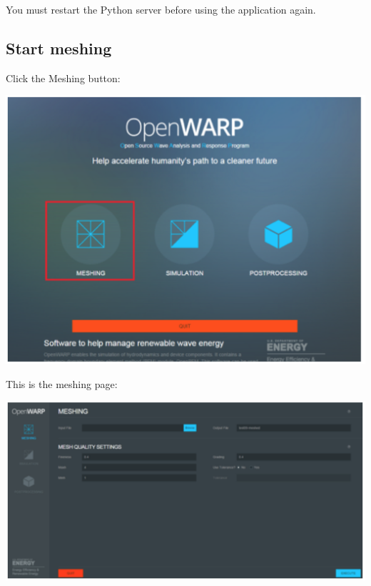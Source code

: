 \documentclass[12pt]{article}
\begin{document}
		You must restart the Python server before using the application again.
		\subsection{Start meshing}
		Click the Meshing button:
		
			\vspace{\abovedisplayskip}
			\begin{minipage}{\linewidth}
				\centering
				\includegraphics[scale=0.4]{img/22}
			\end{minipage}
			\vspace{\belowdisplayskip}
			
			This is the meshing page:
			
				\vspace{\abovedisplayskip}
				\begin{minipage}{\linewidth}
					\centering
					\includegraphics[scale=0.4]{img/23}
				\end{minipage}
				\vspace{\belowdisplayskip}
				
\end{document}
